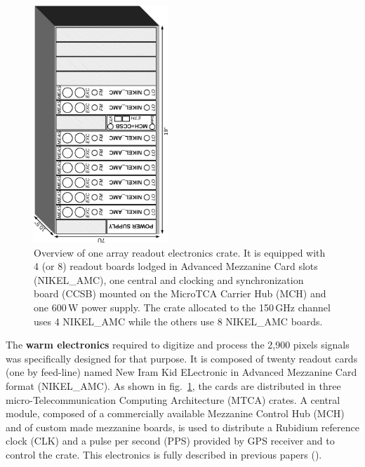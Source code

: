 \documentclass[]{aa} %
\begin{document}
\begin{figure}
\begin{center}
\includegraphics[angle=-90,width=0.45\textwidth]{NIKA_crate}
\caption{Overview of one array readout electronics crate.
It is equipped with 4 (or 8) readout boards lodged in Advanced Mezzanine Card slots (NIKEL\_AMC), one central and clocking and synchronization board (CCSB) mounted on the MicroTCA Carrier Hub (MCH) and one 600\,W power supply.
The crate allocated to the 150\,GHz channel uses 4 NIKEL\_AMC while the others use 8 NIKEL\_AMC boards.
\label{crateFig}}
\end{center}
\end{figure}

The \textbf{warm electronics} required to digitize and process the 2,900 pixels
signals was specifically designed for that purpose.  It is composed of twenty
readout cards (one by feed-line) named New Iram Kid ELectronic in Advanced
Mezzanine Card format (NIKEL\_AMC).  As shown in fig.~\ref{crateFig}, the cards
are distributed in three micro-Telecommunication Computing Architecture (MTCA)
crates.  A central module, composed of a commercially available Mezzanine
Control Hub (MCH) and of custom made mezzanine boards, is used to distribute a
Rubidium reference clock (CLK) and a pulse per second (PPS) provided by GPS
receiver and to control the crate.  This electronics is fully described in
previous papers (\cite{Bourrion2012,Bourrion2016}).
\end{document}
